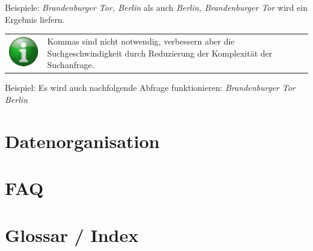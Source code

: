 \documentclass[10pt]{scrreprt}
\begin{document}
\vspace{3mm}
Beispiele: \textit{Brandenburger Tor, Berlin} als auch \textit{Berlin, Brandenburger Tor} wird ein Ergebnis liefern.\\

\vspace{3mm}
\begin{tabular}{p{1cm} p{10cm}}
\includegraphics[scale=0.5]{images/info.eps} &  Kommas sind nicht notwendig, verbessern aber die Suchgeschwindigkeit durch Reduzierung der Komplexität der Suchanfrage.  \\ 
\end{tabular} 

\vspace{3mm}
Beispiel:
Es wird auch nachfolgende Abfrage funktionieren: \textit{Brandenburger Tor Berlin}




\chapter{Datenorganisation}



\chapter{FAQ}



\chapter*{Glossar / Index}


\printindex
\end{document}
